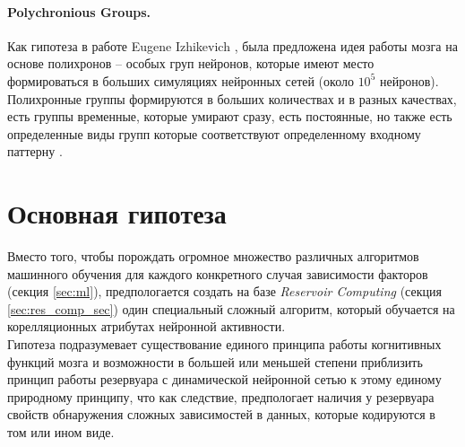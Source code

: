 \documentclass[a4paper,10pt]{article}
\begin{document}
\paragraph*{Polychronious Groups.}
Как гипотеза в работе Eugene Izhikevich \cite{izh_groups}, была предложена идея работы мозга на основе полихронов -- особых груп нейронов, которые имеют место формироваться в больших симуляциях нейронных сетей (около $10^5$ нейронов). Полихронные группы формируются в больших количествах и в разных качествах, есть группы временные, которые умирают сразу, есть постоянные, но также есть определенные виды групп которые соответствуют определенному входному паттерну \cite{patt_groups}.

\section{Основная гипотеза}
Вместо того, чтобы порождать огромное множество различных алгоритмов машинного обучения для каждого конкретного случая зависимости факторов (секция \ref{sec:ml}), предпологается создать на базе \textit{Reservoir Computing} (секция \ref{sec:res_comp_sec}) один специальный сложный алгоритм, который обучается на корелляционных атрибутах нейронной активности.\\
\indent Гипотеза подразумевает существование единого принципа работы когнитивных функций мозга и возможности в большей или меньшей  степени приблизить принцип работы резервуара с динамической нейронной сетью к этому единому природному принципу, что как следствие, предпологает наличия у резервуара свойств обнаружения сложных зависимостей в данных, которые кодируются в том или ином виде.
\end{document}
